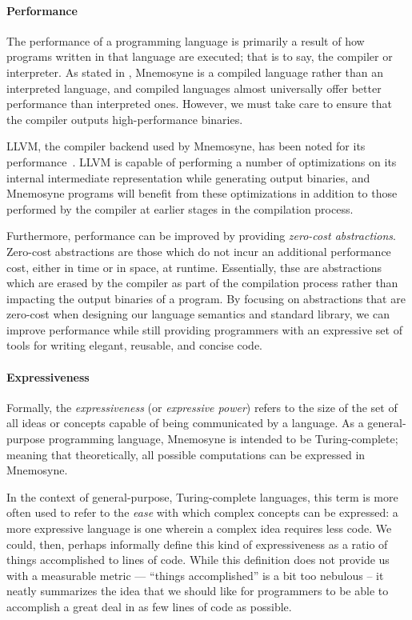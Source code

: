 \paragraph{Performance}

The performance of a programming language is primarily a result of how programs written in that language are executed; that is to say, the compiler or interpreter. As stated in , Mnemosyne is a compiled language rather than an interpreted language, and compiled languages almost universally offer better performance than interpreted ones. However, we must take care to ensure that the compiler outputs high-performance binaries.

LLVM, the compiler backend used by Mnemosyne, has been noted for its performance~\cite{lattner2008llvm,Lattner:2004:LCF:977395.977673,Terei:2010:LBG:1863523.1863538}. LLVM is capable of performing a number of optimizations on its internal intermediate representation while generating output binaries, and Mnemosyne programs will benefit from these optimizations in addition to those performed by the compiler at earlier stages in the compilation process.

Furthermore, performance can be improved by providing \textit{zero-cost abstractions}. Zero-cost abstractions are those which do not incur an additional performance cost, either in time or in space, at runtime. Essentially, thse are abstractions which are erased by the compiler as part of the compilation process rather than impacting the output binaries of a program. By focusing on abstractions that are zero-cost when designing our language semantics and standard library, we can improve performance while still providing programmers with an expressive set of tools for writing elegant, reusable, and concise code.

\paragraph{Expressiveness}

Formally, the \textit{expressiveness} (or \textit{expressive power}) refers to the size of the set of all ideas or concepts capable of being communicated by a language. As a general-purpose programming language, Mnemosyne is intended to be Turing-complete; meaning that theoretically, all possible computations can be expressed in Mnemosyne.

In the context of general-purpose, Turing-complete languages, this term is more often used to refer to the \emph{ease} with which complex concepts can be expressed: a more expressive language is one wherein a complex idea requires less code. We could, then, perhaps informally define this kind of expressiveness as a ratio of things accomplished to lines of code. While this definition does not provide us with a measurable metric --- ``things accomplished'' is a bit too nebulous -- it neatly summarizes the idea that we should like for programmers to be able to accomplish a great deal in as few lines of code as possible.

